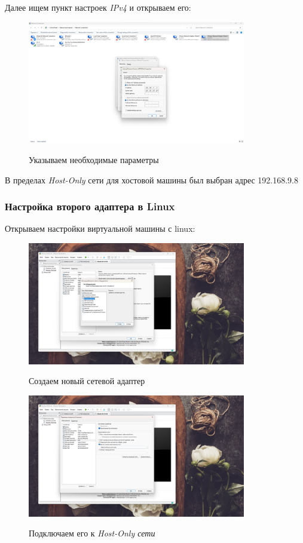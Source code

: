 \documentclass[a4paper]{article}
\begin{document}
  Далее ищем пункт настроек \textit{IPv4} и открываем его:
  
  \begin{figure}[H]
    \centering
    \includegraphics[width=0.85\textwidth]{06_00 (49)}
    \label{img:49}
    \caption{Указываем необходимые параметры}
  \end{figure}

  В пределах \textit{Host-Only} сети для хостовой машины был выбран адрес 192.168.9.8
  
  \subsubsection{Настройка второго адаптера в Linux}

  Открываем настройки виртуальной машины с linux:

  \begin{figure}[H]
    \centering
    \includegraphics[width=0.85\textwidth]{06_00 (50)}
    \label{img:50}
    \caption{Создаем новый сетевой адаптер}
  \end{figure}
  
  \begin{figure}[H]
    \centering
    \includegraphics[width=0.85\textwidth]{06_00 (51)}
    \label{img:51}
    \caption{Подключаем его к \textit{Host-Only сети}}
  \end{figure}
  
\end{document}
